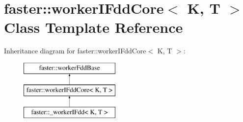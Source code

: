 \hypertarget{classfaster_1_1workerIFddCore}{}\section{faster\+:\+:worker\+I\+Fdd\+Core$<$ K, T $>$ Class Template Reference}
\label{classfaster_1_1workerIFddCore}
Inheritance diagram for faster\+:\+:worker\+I\+Fdd\+Core$<$ K, T $>$\+:\begin{figure}[H]
\begin{center}
\leavevmode
\includegraphics[height=3.000000cm]{classfaster_1_1workerIFddCore}
\end{center}
\end{figure}
